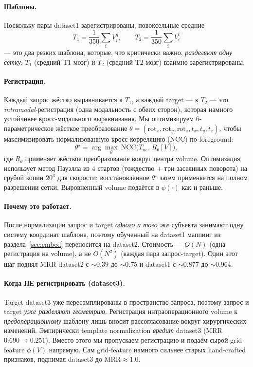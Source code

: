 \documentclass[11pt]{article}
\begin{document}
\paragraph{Шаблоны.} Поскольку пары dataset1 зарегистрированы, повоксельные средние
\begin{equation}
T_1=\frac{1}{350}\sum_i V^q_i,\qquad
T_2=\frac{1}{350}\sum_i V^t_i
\end{equation}
— это два резких шаблона, которые, что критически важно, \emph{разделяют одну сетку}:
$T_1$ (средний T1-мозг) и $T_2$ (средний T2-мозг) взаимно зарегистрированы.

\paragraph{Регистрация.} Каждый запрос жёстко выравнивается к $T_1$, а каждый target — к
$T_2$ --- это \emph{intramodal}-регистрация (одна модальность с обеих сторон), которая
намного устойчивее кросс-модального выравнивания. Мы оптимизируем 6-параметрическое
жёсткое преобразование $\theta=(\text{rot}_x,\text{rot}_y,\text{rot}_z,t_x,t_y,t_z)$,
чтобы максимизировать нормализованную кросс-корреляцию (NCC) по foreground:
\begin{equation}
\theta^\star=\arg\max_{\theta}\ \mathrm{NCC}\big(T_m,\ R_\theta[V]\big),
\end{equation}
где $R_\theta$ применяет жёсткое преобразование вокруг центра volume. Оптимизация
использует метод Пауэлла из $4$ стартов (тождество $+$ три засеянных поворота) на
грубой копии $20^3$ для скорости; восстановленное $\theta^\star$ затем применяется на
полном разрешении сетки. Выровненный volume подаётся в $\phi(\cdot)$ как и раньше.

\paragraph{Почему это работает.} После нормализации запрос и target \emph{одного и того
же} субъекта занимают одну систему координат шаблона, поэтому обученный на dataset1
маппинг из раздела~\ref{sec:embed} переносится на dataset2. Стоимость — $O(N)$ (одна
регистрация на volume), а не $O(N^2)$ (каждая пара запрос-target). Один этот шаг поднял
MRR dataset2 с $\sim0.39$ до $\sim0.75$ и dataset1 с $\sim0.877$ до $\sim0.964$.

\paragraph{Когда НЕ регистрировать (dataset3).} Target dataset3 уже пересэмплированы в
пространство запроса, поэтому запрос и target \emph{уже разделяют геометрию}. Регистрация
интраоперационного volume к \emph{предоперационному} шаблону лишь вносит рассогласование
вокруг хирургических изменений. Эмпирически template normalization \emph{вредит}
dataset3 (MRR $0.690\to0.251$). Вместо этого мы пропускаем регистрацию и подаём сырой
grid-feature $\phi(V)$ напрямую. Сам grid-feature намного сильнее старых hand-crafted
признаков, поднимая dataset3 до $\text{MRR}\approx1.0$.
\end{document}

